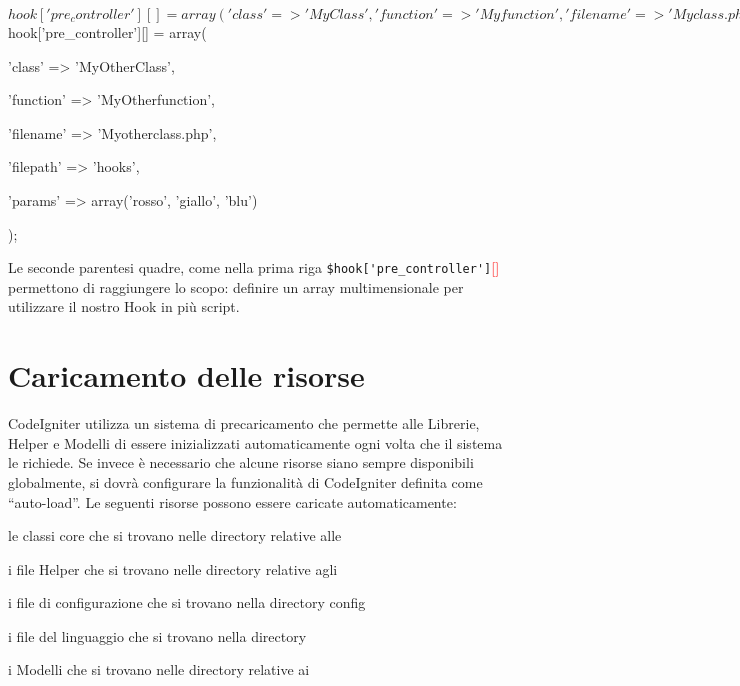 \begin{code}
$hook['pre_controller'][] = array(

	'class'    => 'MyClass',

	'function' => 'Myfunction',

	'filename' => 'Myclass.php',

	'filepath' => 'hooks',

	'params'   => array('birra', 'vino', 'patatine')

	);

$hook['pre_controller'][] = array(

	'class'    => 'MyOtherClass',

	'function' => 'MyOtherfunction',

	'filename' => 'Myotherclass.php',

	'filepath' => 'hooks',

	'params'   => array('rosso', 'giallo', 'blu')

	);
\end{code}

Le seconde parentesi quadre, come nella prima riga \verb|$hook['pre_controller']|\textcolor{red}{[]} permettono di raggiungere lo scopo: definire un array multimensionale per utilizzare il nostro Hook in più script.

\section*{Caricamento delle risorse}
CodeIgniter utilizza un sistema di precaricamento che permette alle Librerie, Helper e Modelli di essere inizializzati automaticamente ogni volta che il sistema le richiede. Se invece è necessario che alcune risorse siano sempre disponibili globalmente, si dovrà configurare la funzionalità di CodeIgniter definita come ``auto-load''. Le seguenti risorse possono essere caricate automaticamente:

\begin{code}
\item le classi core che si trovano nelle directory relative alle 
\item i file Helper che si trovano nelle directory relative agli 
\item i file di configurazione che si trovano nella directory config
\item i file del linguaggio che si trovano nella directory 
\item i Modelli che si trovano nelle  directory relative ai 
\end{code}

